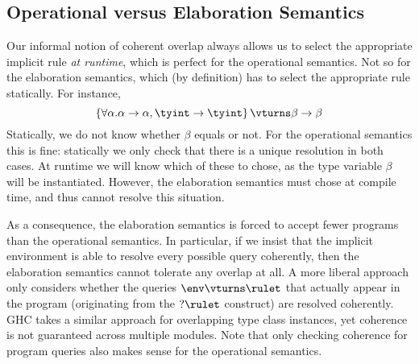 \subsection{Operational versus Elaboration Semantics}
Our informal notion of coherent overlap always allows us to select
the appropriate implicit rule \textit{at runtime}, which is perfect
for the operational semantics.
Not so for the elaboration semantics, which (by definition) has to select the
appropriate rule statically. For instance,
\begin{equation*}
\left\{ \forall \alpha. \alpha \rightarrow \alpha,  
        \tyint \rightarrow \tyint \right\} \vturns \beta \rightarrow \beta
\end{equation*}
Statically, we do not know whether $\beta$ equals \tyint or not.  For the
operational semantics this is fine: statically we only check that there is a
unique resolution in both cases. At runtime we will know which of these to
chose, as the type variable $\beta$ will be instantiated.
However, the elaboration semantics must chose at compile time, and thus cannot
resolve this situation.  

As a consequence, the elaboration semantics is forced to accept fewer programs
than the operational semantics.  In particular, if we insist that the implicit
environment is able to resolve every possible query coherently, then the
elaboration semantics cannot tolerate any overlap at all. A more liberal
approach only considers whether the queries $\env \vturns \rulet$ that actually
appear in the program (originating from the $?\rulet$ construct) are resolved
coherently. GHC takes a similar approach for overlapping type class instances,
yet coherence is not guaranteed across multiple modules. Note that only
checking coherence for program queries also makes sense for the operational
semantics.




